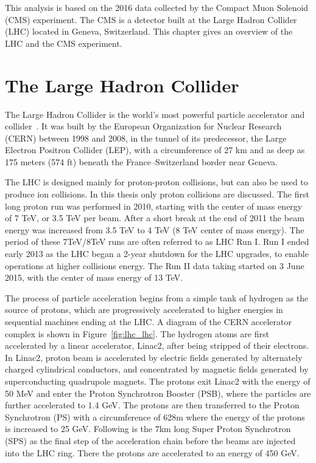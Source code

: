 
This analysis is based on the 2016 data collected by the Compact Muon Solenoid (CMS) experiment. The CMS is a detector built at the Large Hadron Collider (LHC) located in Geneva, Switzerland. This chapter gives an overview of the LHC and the CMS experiment.

\section{The Large Hadron Collider} 
The Large Hadron Collider is the world's most powerful particle accelerator and collider~\cite{lhc_lhcmachine,lhc_lhcreport}. It was built by the European Organization for Nuclear Research (CERN) between 1998 and 2008, in the tunnel of its predecessor, the Large Electron Positron Collider (LEP), with a circumference of 27 km and as deep as 175 meters (574 ft) beneath the France–Switzerland border near Geneva. 

\vspace{0.3cm}
The LHC is designed mainly for proton-proton collisions, but can also be used to produce ion collisions. In this thesis only proton collisions are discussed. The first long proton run was performed in 2010, starting with the center of mass energy of 7 TeV, or 3.5 TeV per beam. After a short break at the end of 2011 the beam energy was increased from 3.5 TeV to 4 TeV (8 TeV center of mass energy). The period of these 7TeV/8TeV runs are often referred to as LHC Run I. Run I ended early 2013 as the LHC began a 2-year shutdown for the LHC upgrades, to enable operations at higher collisions energy. The Run II data taking started on 3 June 2015, with the center of mass energy of 13 TeV. 

\vspace{0.3cm}
The process of particle acceleration begins from a simple tank of hydrogen as the source of protons, which are progressively accelerated to higher energies in sequential machines ending at the LHC. A diagram of the CERN accelerator complex is shown in Figure~\ref{fig:lhc_lhc}. The hydrogen atoms are first accelerated by a linear accelerator, Linac2, after being stripped of their electrons. In Linac2, proton beam is accelerated by electric fields generated by alternately charged cylindrical conductors, and concentrated by magnetic fields generated by superconducting quadrupole magnets. The protons exit Linac2 with the energy of 50 MeV and enter the Proton Synchrotron Booster (PSB), where the particles are further accelerated to 1.4 GeV. The protons are then transferred to the Proton Synchrotron (PS) with a circumference of 628m where the energy of the protons is increased to 25 GeV. Following is the 7km long Super Proton Synchrotron (SPS) as the final step of the acceleration chain before the beams are injected into the LHC ring. There the protons are accelerated to an energy of 450 GeV.

